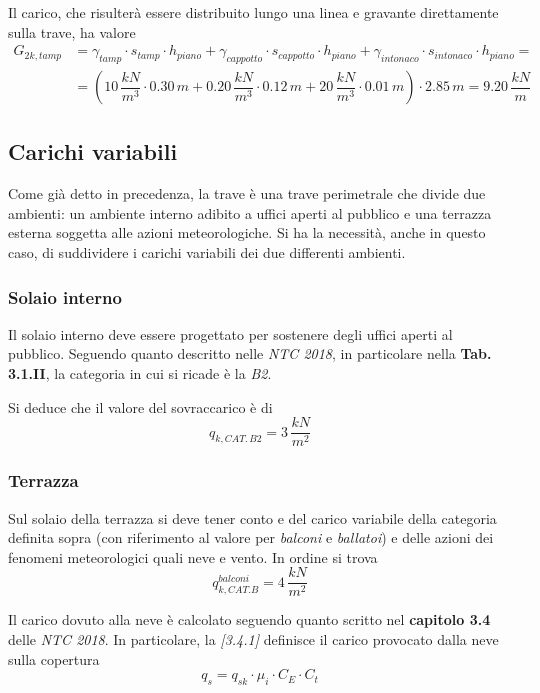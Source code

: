 Il carico, che risulterà essere distribuito lungo una linea e gravante direttamente sulla trave, ha valore
\begin{align*}
 G_{2k, tamp} &= \gamma_{tamp} \cdot s_{tamp} \cdot h_{piano} + \gamma_{cappotto} \cdot s_{cappotto} \cdot h_{piano} + \gamma_{intonaco} \cdot s_{intonaco} \cdot h_{piano} =\\
 &= \left(10\,\dfrac{kN}{m^3}\cdot 0.30\,\si{m} + 0.20\,\dfrac{kN}{m^3}\cdot 0.12\,\si{m} + 20\,\dfrac{kN}{m^3}\cdot 0.01\,\si{m}\right)\cdot 2.85\,\si{m} = 9.20\,\dfrac{kN}{m}
\end{align*}


\subsection{Carichi variabili}
Come già detto in precedenza, la trave è una trave perimetrale che divide due ambienti: un ambiente interno adibito a uffici aperti al pubblico e una terrazza esterna soggetta alle azioni meteorologiche. Si ha la necessità, anche in questo caso, di suddividere i carichi variabili dei due differenti ambienti.

\subsubsection*{Solaio interno}
Il solaio interno deve essere progettato per sostenere degli uffici aperti al pubblico. Seguendo quanto descritto nelle \emph{NTC 2018}, in particolare nella \textbf{Tab. 3.1.II}, la categoria in cui si ricade è la \emph{B2}. 

Si deduce che il valore del sovraccarico è di 
\[
 q_{k, CAT.\,B2} = 3\,\dfrac{kN}{m^2}
\]

\subsubsection*{Terrazza}
Sul solaio della terrazza si deve tener conto e del carico variabile della categoria definita sopra (con riferimento al valore per \emph{balconi} e \emph{ballatoi}) e delle azioni dei fenomeni meteorologici quali neve e vento. In ordine si trova
\[
 q_{k, CAT.B}^{balconi} = 4\,\dfrac{kN}{m^2}
\]

Il carico dovuto alla neve è calcolato seguendo quanto scritto nel \textbf{capitolo 3.4} delle \emph{NTC 2018}. In particolare, la \emph{[3.4.1]} definisce il carico provocato dalla neve sulla copertura
\[
 q_s = q_{sk}\cdot \mu_i \cdot C_E \cdot C_t
\]

